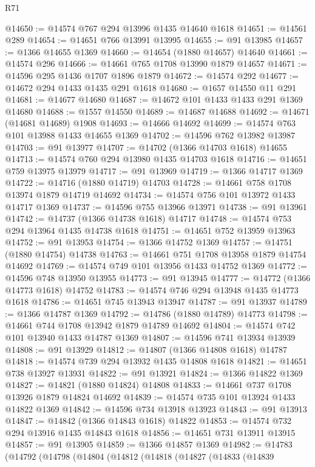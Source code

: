 \begin{lexlean}{R71}
\begin{coremodule}
@14650 := @14574 @767 @294 @13996 @1435 @14640 @1618
@14651 := @14561 @289
@14654 := @14651 @766 @13991 @13995
@14655 := @91 @13985
@14657 := @1366 @14655 @1369
@14660 := @14654 (@1880 @14657) @14640
@14661 := @14574 @296
@14666 := @14661 @765 @1708 @13990 @1879 @14657
@14671 := @14596 @295 @1436 @1707 @1896 @1879
@14672 := @14574 @292
@14677 := @14672 @294 @1433 @1435 @291 @1618
@14680 := @1657 @14550 @11 @291
@14681 := @14677 @14680
@14687 := @14672 @101 @1433 @1433 @291 @1369 @14680
@14688 := @1557 @14550
@14689 := @14687 @14688
@14692 := @14671 (@14681 @14689) @1908
@14693 := @14666 @14692
@14699 := @14574 @763 @101 @13988 @1433 @14655 @1369
@14702 := @14596 @762 @13982 @13987
@14703 := @91 @13977
@14707 := @14702 (@1366 @14703 @1618) @14655
@14713 := @14574 @760 @294 @13980 @1435 @14703 @1618
@14716 := @14651 @759 @13975 @13979
@14717 := @91 @13969
@14719 := @1366 @14717 @1369
@14722 := @14716 (@1880 @14719) @14703
@14728 := @14661 @758 @1708 @13974 @1879 @14719 @14692
@14734 := @14574 @756 @101 @13972 @1433 @14717 @1369
@14737 := @14596 @755 @13966 @13971
@14738 := @91 @13961
@14742 := @14737 (@1366 @14738 @1618) @14717
@14748 := @14574 @753 @294 @13964 @1435 @14738 @1618
@14751 := @14651 @752 @13959 @13963
@14752 := @91 @13953
@14754 := @1366 @14752 @1369
@14757 := @14751 (@1880 @14754) @14738
@14763 := @14661 @751 @1708 @13958 @1879 @14754 @14692
@14769 := @14574 @749 @101 @13956 @1433 @14752 @1369
@14772 := @14596 @748 @13950 @13955
@14773 := @91 @13945
@14777 := @14772 (@1366 @14773 @1618) @14752
@14783 := @14574 @746 @294 @13948 @1435 @14773 @1618
@14786 := @14651 @745 @13943 @13947
@14787 := @91 @13937
@14789 := @1366 @14787 @1369
@14792 := @14786 (@1880 @14789) @14773
@14798 := @14661 @744 @1708 @13942 @1879 @14789 @14692
@14804 := @14574 @742 @101 @13940 @1433 @14787 @1369
@14807 := @14596 @741 @13934 @13939
@14808 := @91 @13929
@14812 := @14807 (@1366 @14808 @1618) @14787
@14818 := @14574 @739 @294 @13932 @1435 @14808 @1618
@14821 := @14651 @738 @13927 @13931
@14822 := @91 @13921
@14824 := @1366 @14822 @1369
@14827 := @14821 (@1880 @14824) @14808
@14833 := @14661 @737 @1708 @13926 @1879 @14824 @14692
@14839 := @14574 @735 @101 @13924 @1433 @14822 @1369
@14842 := @14596 @734 @13918 @13923
@14843 := @91 @13913
@14847 := @14842 (@1366 @14843 @1618) @14822
@14853 := @14574 @732 @294 @13916 @1435 @14843 @1618
@14856 := @14651 @731 @13911 @13915
@14857 := @91 @13905
@14859 := @1366 @14857 @1369
@14982 := @14783
    (@14792
      (@14798
        (@14804
          (@14812
            (@14818
              (@14827
                (@14833
                  (@14839

\end{coremodule}
\end{lexlean}
